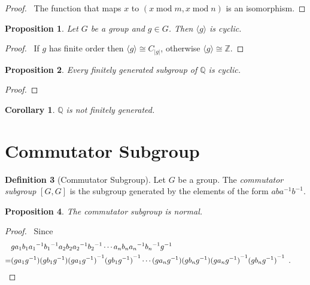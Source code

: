 \documentclass{book}
\let\qed\relax
\newtheorem{prop}{Proposition}[chapter]
\newtheorem{cor}{Corollary}[prop]
\theoremstyle{definition}
\newtheorem{df}[prop]{Definition}
\newcommand{\inv}[1]{\ensuremath{{#1}^{-1}}}
\renewcommand{\mod}{\ensuremath{\operatorname{mod}}}
\begin{document}
\begin{proof}
    \pf\ The function that maps $x$ to $(x \mod m, x \mod n)$ is an isomorphism. \qed
\end{proof}

\begin{prop}
Let $G$ be a group and $g \in G$. Then $\langle g \rangle$ is cyclic.
\end{prop}

\begin{proof}
\pf\ If $g$ has finite order then $\langle g \rangle \cong C_{|g|}$, otherwise $\langle g \rangle \cong \mathbb{Z}$. \qed
\end{proof}

\begin{prop}
Every finitely generated subgroup of $\mathbb{Q}$ is cyclic.
\end{prop}

\begin{proof}
\pf
{}
\qed
\end{proof}

\begin{cor}
$\mathbb{Q}$ is not finitely generated.
\end{cor}

\section{Commutator Subgroup}

\begin{df}[Commutator Subgroup]
Let $G$ be a group. The \emph{commutator subgroup} $[G,G]$ is the subgroup generated by the elements of the form $ab\inv{a}\inv{b}$.
\end{df}

\begin{prop}
The commutator subgroup is normal.
\end{prop}

\begin{proof}
\pf\ Since
\begin{align*} 
& g a_1 b_1 \inv{a_1} \inv{b_1} a_2 b_2 \inv{a_2} \inv{b_2} \cdots a_n b_n \inv{a_n} \inv{b_n} \inv{g} \\
= & (g a_1 \inv{g}) (g b_1 \inv{g}) \inv{(g a_1 \inv{g})} \inv{(g b_1 \inv{g})} \cdots (g a_n \inv{g}) (g b_n \inv{g}) \inv{(g a_n \inv{g})} \inv{(g b_n \inv{g})} \enspace . \qquad \qed
\end{align*}
\end{proof}
\end{document}
